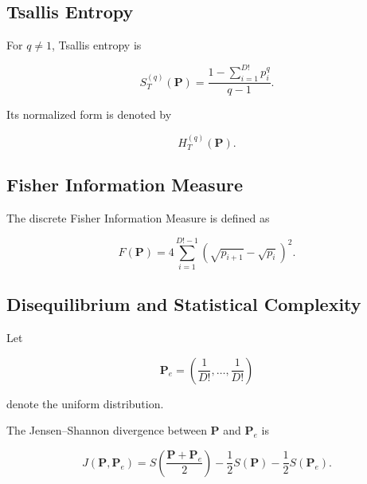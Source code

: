 \documentclass[journal]{IEEEtran}
\begin{document}
	
	\subsection{Tsallis Entropy}
	
	For $q\neq1$, Tsallis entropy is
	
	\begin{equation}
		S_T^{(q)}(\mathbf{P})
		=
		\frac{
			1-\sum_{i=1}^{D!}p_i^q
		}{
			q-1
		}.
	\end{equation}
	
	Its normalized form is denoted by
	
	\begin{equation}
		H_T^{(q)}(\mathbf{P}).
	\end{equation}
	
	
	\subsection{Fisher Information Measure}
	
	The discrete Fisher Information Measure is defined as
	
	\begin{equation}
		F(\mathbf{P})
		=
		4
		\sum_{i=1}^{D!-1}
		\left(
		\sqrt{p_{i+1}}
		-
		\sqrt{p_i}
		\right)^2.
		\label{eq:fisher}
	\end{equation}
	
	
	\subsection{Disequilibrium and Statistical Complexity}
	
	Let
	
	\begin{equation}
		\mathbf{P}_e =
		\left(
		\frac{1}{D!},\ldots,\frac{1}{D!}
		\right)
	\end{equation}
	
	denote the uniform distribution.
	
	The Jensen--Shannon divergence between $\mathbf{P}$ and
	$\mathbf{P}_e$ is
	
	\begin{equation}
		J(\mathbf{P},\mathbf{P}_e)
		=
		S\left(
		\frac{\mathbf{P}+\mathbf{P}_e}{2}
		\right)
		-
		\frac{1}{2}S(\mathbf{P})
		-
		\frac{1}{2}S(\mathbf{P}_e).
	\end{equation}
	
\end{document}
